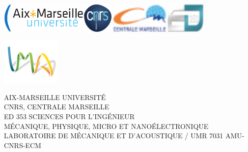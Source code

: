 \thispagestyle{empty}
\vspace*{-2.6cm}
\begin{center}
  \begin{minipage}[c]{0.73\linewidth}
    \raggedright\includegraphics[height=1.5cm]{images_pdf/logo_Aix_Marseille_Universite.pdf}\quad\includegraphics[height=1.5cm]{images_pdf/logo_CNRS_fr_quadri_svg.pdf}\quad\includegraphics[height=1.5cm]{images_pdf/Logo_centrale_marseille.pdf}\quad\includegraphics[height=1.5cm]{images_pdf/logo_ED353_light_ligthblue_notext_4.pdf}
  \end{minipage}\hfill
  \begin{minipage}[c]{0.27\linewidth}
    \raggedleft\includegraphics[height=2.3cm]{images_pdf/logo_lma_picto_web_transp.pdf}
  \end{minipage}\hfill
\end{center}
\begin{flushleft}
AIX-MARSEILLE UNIVERSITÉ\\
CNRS, CENTRALE MARSEILLE\\
  \small
ED 353 SCIENCES POUR L'INGÉNIEUR\\
MÉCANIQUE, PHYSIQUE, MICRO ET NANOÉLECTRONIQUE\\
  \vspace{0.5cm}
  LABORATOIRE DE MÉCANIQUE ET D'ACOUSTIQUE / UMR 7031 AMU-CNRS-ECM\\
  \vspace{0.5cm}
\end{flushleft}

